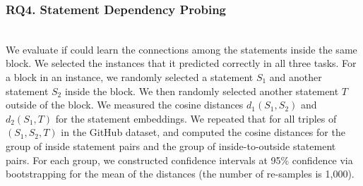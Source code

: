 \subsubsection{RQ4. Statement Dependency Probing}~\\
We evaluate if {\tool} could learn the connections
among the statements inside the same  block. We
selected the instances that it predicted correctly in all three
tasks. For a  block in an instance, we randomly
selected a statement $S_1$ and another statement $S_2$ inside the
block. We then randomly selected another statement $T$ outside of the
block. We measured the cosine distances $d_1(S_1,S_2)$ and $d_2(S_1,T)$
for the statement embeddings. We repeated that for all triples
of $(S_1,S_2,T)$ in the GitHub dataset, and computed the cosine
distances for the group of inside statement pairs and the group of
inside-to-outside statement pairs. For each group, we constructed
confidence intervals at 95\% confidence via bootstrapping for the mean
of the distances (the number of re-samples is 1,000).





